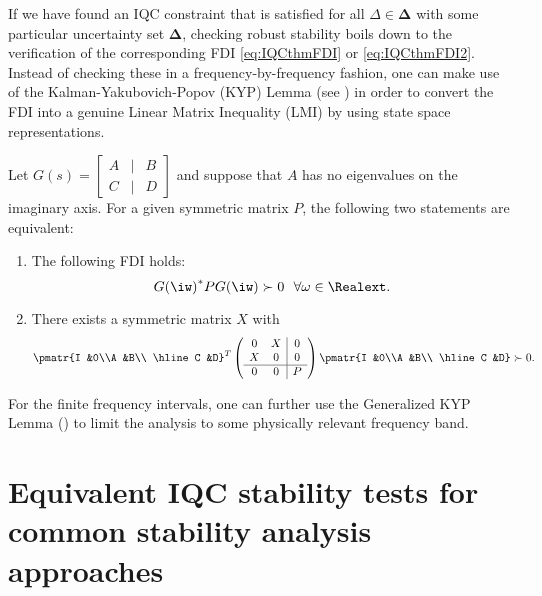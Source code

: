 If we have found an IQC constraint that is satisfied for all $\Delta\in\bm{\Delta}$ with some particular uncertainty set $\bm{\Delta}$, checking robust stability boils down to the verification of the corresponding FDI \eqref{eq:IQCthmFDI} or \eqref{eq:IQCthmFDI2}. Instead of checking these in a frequency-by-frequency fashion, one can make use of the Kalman-Yakubovich-Popov (KYP) Lemma (see \cite{rantzerkyp}) in order to convert the FDI into a genuine Linear Matrix Inequality (LMI) by using state space representations.
\begin{thm} {Let $G(s) = {\scriptstyle \left[\begin{smallmatrix}{A}&|&{B}\\\hline{C}&|&{D}\end{smallmatrix}\right]}$ and suppose that $A$ has no eigenvalues on the imaginary axis.} {For a given symmetric matrix $P$}, the following {two statements} are equivalent:
\begin{enumerate}
	\item {The following FDI holds:}
	\begin{equation}
	{G(\iw)}^*P {G(\iw)} \succ 0 \ \ \forall \omega\in\Realext.
	\label{eq:KYPFDI}
	\end{equation}
	\item There exists a symmetric matrix $X$ with
	\begin{equation}
	\pmatr{I &0\\A &B\\ \hline C &D}^T \left(\begin{array}{cc|c}0 &X &0\\X &0 &0\\ \hline 0 &0 &P\end{array}\right) \pmatr{I &0\\A &B\\ \hline C &D} \succ 0.
	\label{eq:KYPLMI}
	\end{equation}
\end{enumerate}
\end{thm}
For the finite frequency intervals, one can further use the Generalized KYP Lemma (\cite{genelKYP}) to limit the analysis to some physically relevant frequency band.

\section{Equivalent IQC stability tests for common stability analysis approaches}\label{sec:IQCeq}

